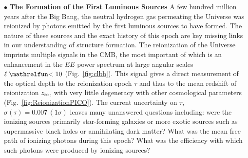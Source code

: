 \documentclass[PICOAPC.tex]{subfiles}
\begin{document}
 
$\bullet$ {\bf The Formation of the First Luminous Sources} \hspace{0.1in} \label{sec:luminoussources}  A few hundred million years after the Big Bang, the neutral hydrogen gas permeating the Universe was reionized by photons emitted by the first luminous sources to have formed.  The nature of these sources and the exact history of this epoch are key missing links in our understanding of structure formation.  
The reionization of the Universe imprints multiple signals in the CMB, the most important of which is an enhancement in the $EE$ power spectrum at large angular scales $\ell \simlt 10$ (Fig.~\ref{fig:clbb}). This signal gives a direct measurement of the optical depth to the reionization epoch $\tau$ and thus to the mean redshift of reionization $z_{\rm re}$, with very little degeneracy with other cosmological parameters (Fig.~\ref{fig:ReionizationPICO}). The current uncertainty on $\tau$, $\sigma(\tau)=0.007\, (1\sigma)$ leaves many unanswered questions including: were the ionizing sources primarily star-forming galaxies or more exotic sources such as supermassive black holes or annihilating dark matter? What was the mean free path of ionizing photons during this epoch?  What was the efficiency with which such photons were produced by ionizing sources?  
\end{document}
